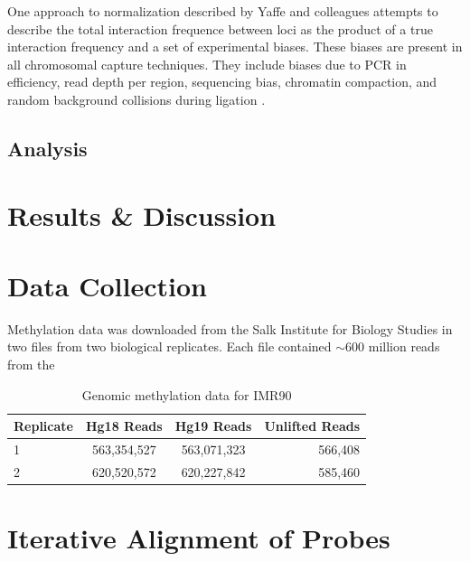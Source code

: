 \documentclass[phd,tocprelim]{cornell}
\begin{document}
One approach to normalization described by Yaffe and colleagues\cite{yaffe2011}
attempts to describe the total interaction frequence between loci as the product
of a true interaction frequency and a set of experimental biases.  These biases
are present in all chromosomal capture techniques.  They include biases due to
PCR in efficiency, read depth per region, sequencing bias, chromatin compaction,
and random background collisions during
ligation\cite{benner2014} \cite{dekker2006}.



\section{Analysis}






\chapter{Results \& Discussion}


%
%

\appendix
\appendixpage%
\addappheadtotoc%
\chapter{Data Collection}

Methylation data was downloaded from the Salk Institute for Biology Studies in
two files from two biological replicates.  Each file contained $\sim600$ million
reads from the

\begin{table}
  \centering
  \begin{tabular}{lccr}
    \hline
    Replicate & Hg18 Reads & Hg19 Reads & Unlifted Reads \\ \hline
    1 & 563,354,527 & 563,071,323 & 566,408 \\
    2 & 620,520,572 & 620,227,842 & 585,460 \\
    \hline
  \end{tabular}
  \caption{Genomic methylation data for IMR90}
\end{table}


\chapter{Iterative Alignment of Probes}
\end{document}
